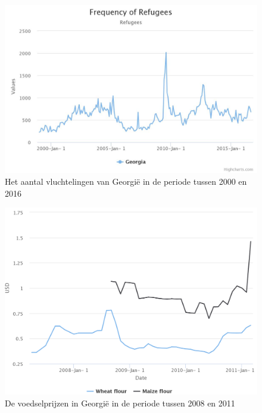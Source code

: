 \documentclass{article}
\begin{document}
\begin{figure}[h!]
        \centering
        \includegraphics[scale=0.28]{images/refugees_georgia.jpeg}
        \caption{Het aantal vluchtelingen van Georgië in de periode tussen 2000 en 2016}
        \medskip
        \small
        \label{fig_ref_geor}
        \end{figure}


 \begin{figure}[h!]
        \centering
        \includegraphics[scale=0.25]{images/Georgia.png}
        \caption{De voedselprijzen in Georgië in de periode tussen 2008 en 2011}
        \medskip
        \small
        \label{georgia}
        \end{figure}
        
\end{document}
